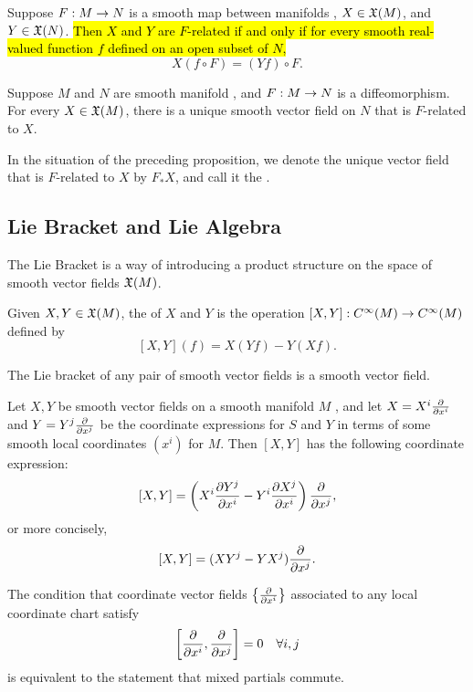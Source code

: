 \setcounter{thm}{15}

\begin{prop}
Suppose $F:M\rightarrow N$ is a smooth map between manifolds \wowob, $X\in \mathfrak{X}(M)$, and $Y\in \mathfrak{X}(N)$. \hl{Then $X$ and $Y$ are $F$-related if and only if for every smooth real-valued function $f$ defined on an open subset of $N$,}
\[X(f\circ F) = (Yf)\circ F.\]
\end{prop}

\setcounter{thm}{18}

\begin{prop}
Suppose $M$ and $N$ are smooth manifold \wowob, and $F:M\rightarrow N$ is a diffeomorphism. For every $X\in \mathfrak{X}(M)$, there is a unique smooth vector field on $N$ that is $F$-related to $X$.
\end{prop}

\dfn In the situation of the preceding proposition, we denote the unique vector field that is $F$-related to $X$ by $F_*X$, and call it the .


\subsection{Lie Bracket and Lie Algebra}\nl

The Lie Bracket is a way of introducing a product structure on the space of smooth vector fields $\mathfrak{X}(M)$.

\dfn Given $X,Y\in \mathfrak{X}(M)$, the  of $X$ and $Y$ is the operation $[X,Y]:C^\infty(M)\rightarrow C^\infty(M)$ defined by
\[[X,Y](f) = X(Yf) - Y(Xf).\]

\setcounter{thm}{24}

\begin{lem}
The Lie bracket of any pair of smooth vector fields is a smooth vector field.
\end{lem}

\begin{prop}
Let $X,Y$ be smooth vector fields on a smooth manifold $M$ \wowob, and let $X = X^i\frac{\partial}{\partial x^i}$ and $Y = Y^j\frac{\partial}{\partial x^j}$ be the coordinate expressions for $S$ and $Y$ in terms of some smooth local coordinates $(x^i)$ for $M$. Then $[X,Y]$ has the following coordinate expression:
\[[X,Y] = \left( X^i\frac{\partial{Y^j}}{\partial{x^i}} - Y^i\frac{\partial{X^j}}{\partial{x^i}}\right) \frac{\partial}{\partial x^j},\]
or more concisely,
\[[X,Y] = (XY^j - YX^j)\frac{\partial}{\partial x^j}.\]
\end{prop}

\crly The condition that coordinate vector fields $\left\{\frac{\partial}{\partial x^i}\right\}$ associated to any local coordinate chart satisfy
\[\left[ \frac{\partial}{\partial x^i},\frac{\partial}{\partial x^j}\right] = 0 \quad\forall i,j\]
is equivalent to the statement that mixed partials commute.

